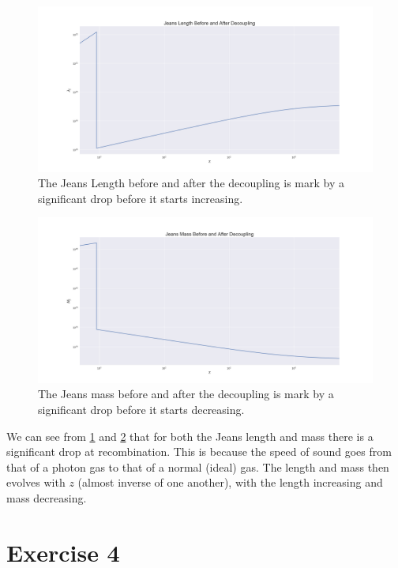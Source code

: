\documentclass[a4paper,norsk, 10pt]{article}
\begin{document}
\begin{figure}[H]
\centering
\includegraphics[scale=0.25]{length}
\caption{The Jeans Length before and after the decoupling is mark by a significant drop before it starts increasing.}\label{fig:length}
\end{figure}

\begin{figure}[H]
\centering
\includegraphics[scale=0.25]{mass}
\caption{The Jeans mass before and after the decoupling is mark by a significant drop before it starts decreasing.}\label{fig:mass}
\end{figure}


We can see from \ref{fig:length} and \ref{fig:mass} that for both the Jeans length and mass there is a significant drop at recombination. This is because the speed of sound goes from that of a photon gas to that of a normal (ideal) gas. The length and mass then evolves with $z$ (almost inverse of one another), with the length increasing and mass decreasing.

\section{Exercise 4}
\end{document}
